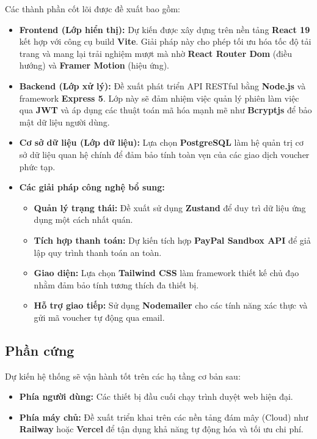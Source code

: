 Các thành phần cốt lõi được đề xuất bao gồm:

\begin{itemize}
    \item \textbf{Frontend (Lớp hiển thị):} Dự kiến được xây dựng trên nền tảng \textbf{React 19} kết hợp với công cụ build \textbf{Vite}. Giải pháp này cho phép tối ưu hóa tốc độ tải trang và mang lại trải nghiệm mượt mà nhờ \textbf{React Router Dom} (điều hướng) và \textbf{Framer Motion} (hiệu ứng).
    \item \textbf{Backend (Lớp xử lý):} Đề xuất phát triển API RESTful bằng \textbf{Node.js} và framework \textbf{Express 5}. Lớp này sẽ đảm nhiệm việc quản lý phiên làm việc qua \textbf{JWT} và áp dụng các thuật toán mã hóa mạnh mẽ như \textbf{Bcryptjs} để bảo mật dữ liệu người dùng.
    \item \textbf{Cơ sở dữ liệu (Lớp dữ liệu):} Lựa chọn \textbf{PostgreSQL} làm hệ quản trị cơ sở dữ liệu quan hệ chính để đảm bảo tính toàn vẹn của các giao dịch voucher phức tạp.
    \item \textbf{Các giải pháp công nghệ bổ sung:}
    \begin{itemize}
        \item \textbf{Quản lý trạng thái:} Đề xuất sử dụng \textbf{Zustand} để duy trì dữ liệu ứng dụng một cách nhất quán.
        \item \textbf{Tích hợp thanh toán:} Dự kiến tích hợp \textbf{PayPal Sandbox API} để giả lập quy trình thanh toán an toàn.
        \item \textbf{Giao diện:} Lựa chọn \textbf{Tailwind CSS} làm framework thiết kế chủ đạo nhằm đảm bảo tính tương thích đa thiết bị.
        \item \textbf{Hỗ trợ giao tiếp:} Sử dụng \textbf{Nodemailer} cho các tính năng xác thực và gửi mã voucher tự động qua email.
    \end{itemize}
\end{itemize}

\subsection{Phần cứng}
Dự kiến hệ thống sẽ vận hành tốt trên các hạ tầng cơ bản sau:
\begin{itemize}
    \item \textbf{Phía người dùng:} Các thiết bị đầu cuối chạy trình duyệt web hiện đại.
    \item \textbf{Phía máy chủ:} Đề xuất triển khai trên các nền tảng đám mây (Cloud) như \textbf{Railway} hoặc \textbf{Vercel} để tận dụng khả năng tự động hóa và tối ưu chi phí.
\end{itemize}
